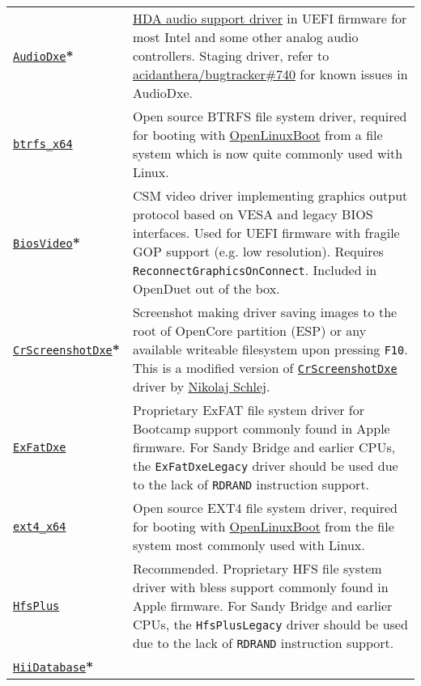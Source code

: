 \documentclass[]{article}
\begin{document}
\begin{longtable}{p{1.3in}p{5.55in}}
\href{https://github.com/acidanthera/OpenCorePkg}{\texttt{AudioDxe}}\textbf{*}
& \hyperref[uefiaudio]{HDA audio support driver} in UEFI firmware for most Intel and some other analog audio controllers.
  Staging driver, refer to \href{https://github.com/acidanthera/bugtracker/issues/740}{acidanthera/bugtracker\#740}
  for known issues in AudioDxe. \\
\href{https://github.com/acidanthera/OcBinaryData}{\texttt{btrfs\_x64}}
& Open source BTRFS file system driver, required for booting with \hyperref[uefilinux]{OpenLinuxBoot}
  from a file system which is now quite commonly used with Linux. \\
\href{https://github.com/acidanthera/OpenCorePkg}{\texttt{BiosVideo}}\textbf{*}
& CSM video driver implementing graphics output protocol based on VESA and legacy
  BIOS interfaces. Used for UEFI firmware with fragile GOP support (e.g. low resolution).
  Requires \texttt{ReconnectGraphicsOnConnect}. Included in OpenDuet out of the box. \\
\href{https://github.com/acidanthera/OpenCorePkg}{\texttt{CrScreenshotDxe}}\textbf{*}
& Screenshot making driver saving images to the root of OpenCore partition (ESP) or
  any available writeable filesystem upon pressing \texttt{F10}.
  This is a modified version of \href{https://github.com/LongSoft/CrScreenshotDxe}{\texttt{CrScreenshotDxe}}
  driver by \href{https://github.com/NikolajSchlej}{Nikolaj Schlej}. \\
\href{https://github.com/acidanthera/OcBinaryData}{\texttt{ExFatDxe}}
& Proprietary ExFAT file system driver for Bootcamp support commonly found in Apple
  firmware. For Sandy Bridge and earlier CPUs, the \texttt{ExFatDxeLegacy} driver should be
  used due to the lack of \texttt{RDRAND} instruction support. \\
\href{https://github.com/acidanthera/OcBinaryData}{\texttt{ext4\_x64}}
& Open source EXT4 file system driver, required for booting with \hyperref[uefilinux]{OpenLinuxBoot}
  from the file system most commonly used with Linux. \\
\href{https://github.com/acidanthera/OcBinaryData}{\texttt{HfsPlus}}
& Recommended. Proprietary HFS file system driver with bless support commonly found in Apple
  firmware. For Sandy Bridge and earlier CPUs, the \texttt{HfsPlusLegacy} driver should be
  used due to the lack of \texttt{RDRAND} instruction support. \\
\href{https://github.com/acidanthera/audk}{\texttt{HiiDatabase}}\textbf{*}

\end{longtable}
\end{document}
